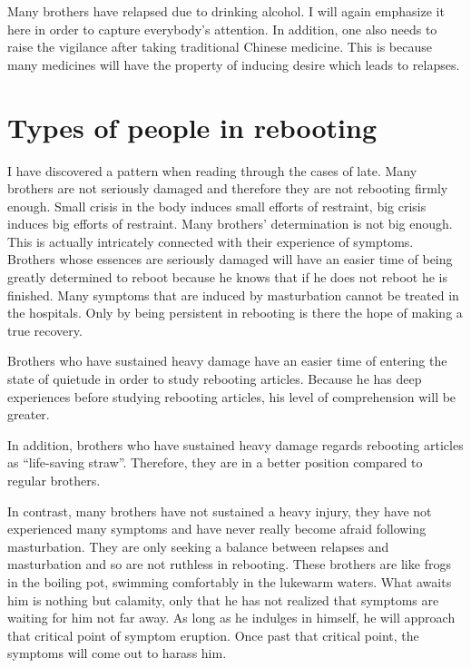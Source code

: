 \documentclass[
]{book}
\begin{document}
Many brothers have relapsed due to drinking alcohol. I will again emphasize it here in order to capture everybody's attention. In addition, one also needs to raise the vigilance after taking traditional Chinese medicine. This is because many medicines will have the property of inducing desire which leads to relapses.

\hypertarget{types-of-people-in-rebooting}{%
\section{Types of people in rebooting}\label{types-of-people-in-rebooting}}

I have discovered a pattern when reading through the cases of late. Many brothers are not seriously damaged and therefore they are not rebooting firmly enough. Small crisis in the body induces small efforts of restraint, big crisis induces big efforts of restraint. Many brothers' determination is not big enough. This is actually intricately connected with their experience of symptoms. Brothers whose essences are seriously damaged will have an easier time of being greatly determined to reboot because he knows that if he does not reboot he is finished. Many symptoms that are induced by masturbation cannot be treated in the hospitals. Only by being persistent in rebooting is there the hope of making a true recovery.

Brothers who have sustained heavy damage have an easier time of entering the state of quietude in order to study rebooting articles. Because he has deep experiences before studying rebooting articles, his level of comprehension will be greater.

In addition, brothers who have sustained heavy damage regards rebooting articles as ``life-saving straw''. Therefore, they are in a better position compared to regular brothers.

In contrast, many brothers have not sustained a heavy injury, they have not experienced many symptoms and have never really become afraid following masturbation. They are only seeking a balance between relapses and masturbation and so are not ruthless in rebooting. These brothers are like frogs in the boiling pot, swimming comfortably in the lukewarm waters. What awaits him is nothing but calamity, only that he has not realized that symptoms are waiting for him not far away. As long as he indulges in himself, he will approach that critical point of symptom eruption. Once past that critical point, the symptoms will come out to harass him.
\end{document}
